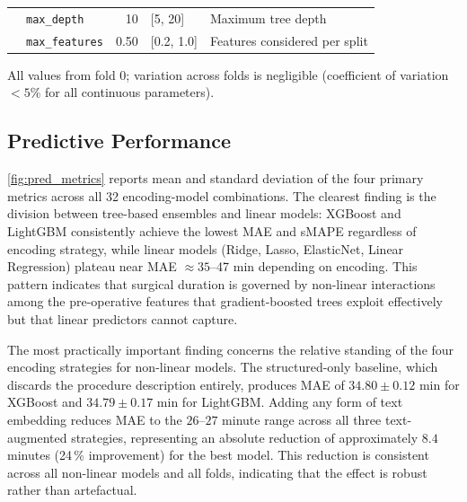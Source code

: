 \documentclass[3p]{elsarticle}
\begin{document}
\begin{table}[tp]
\begin{threeparttable}
{\begin{tabular}{llrll}
              & \texttt{max\_depth}     & 10  & [5, 20]          & Maximum tree depth \\
              & \texttt{max\_features}  & 0.50 & [0.2, 1.0]      & Features considered per split \\
\bottomrule
\end{tabular}}
\begin{tablenotes}
\small
\item All values from fold 0; variation across folds is negligible (coefficient of variation $< 5\%$ for all continuous parameters).
\end{tablenotes}
\end{threeparttable}
\end{table}

\subsection{Predictive Performance}
\label{sec:perf}

\cref{fig:pred_metrics} reports mean and standard deviation of the four primary metrics across all 32 encoding-model combinations. The clearest finding is the division between tree-based ensembles and linear models: XGBoost and LightGBM consistently achieve the lowest MAE and sMAPE regardless of encoding strategy, while linear models (Ridge, Lasso, ElasticNet, Linear Regression) plateau near MAE $\approx 35$--47 min depending on encoding. This pattern indicates that surgical duration is governed by non-linear interactions among the pre-operative features that gradient-boosted trees exploit effectively but that linear predictors cannot capture.

The most practically important finding concerns the relative standing of the four encoding strategies for non-linear models. The structured-only baseline, which discards the procedure description entirely, produces MAE of $34.80 \pm 0.12$ min for XGBoost and $34.79 \pm 0.17$ min for LightGBM. Adding any form of text embedding reduces MAE to the $26$--$27$ minute range across all three text-augmented strategies, representing an absolute reduction of approximately $8.4$ minutes (24\,\% improvement) for the best model. This reduction is consistent across all non-linear models and all folds, indicating that the effect is robust rather than artefactual.
\end{document}
